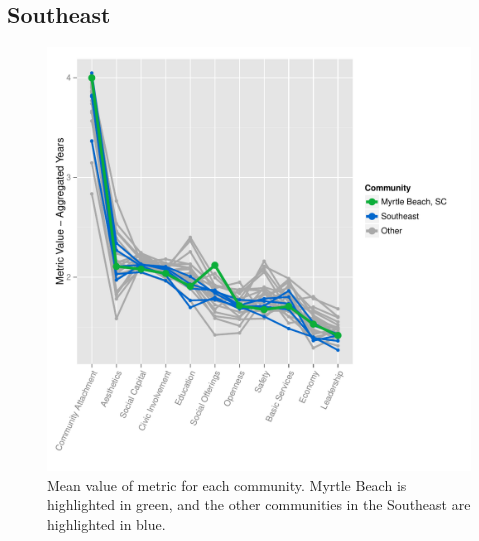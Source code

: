 \documentclass[11pt]{article}\usepackage{knitr}
\begin{document}
\subsection*{Southeast}
\begin{knitrout}
\color{fgcolor}\begin{figure}[H]

\includegraphics[width=\maxwidth]{figure/southeast_one} \caption[Mean value of metric for each community]{Mean value of metric for each community. Myrtle Beach is highlighted in green, and the other communities in the Southeast are highlighted in blue.\label{fig:southeast_one}}
\end{figure}


\end{knitrout}
\end{document}
